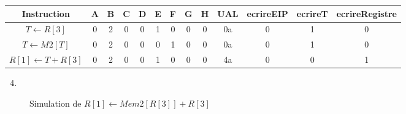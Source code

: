 \documentclass{article}
\begin{document}
\begin{minipage}[h]{\linewidth}
	\centering
	\begin{tabular}{*{13}{|c} |}
		\hline
		Instruction                & A & B & C & D & E & F & G & H & UAL & ecrireEIP & ecrireT & ecrireRegistre \\ \hline
		$T \leftarrow R[3]$        & 0 & 2 & 0 & 0 & 1 & 0 & 0 & 0 & 0a  & 0         & 1       & 0              \\ \hline
		$T \leftarrow M2[T]$       & 0 & 2 & 0 & 0 & 0 & 1 & 0 & 0 & 0a  & 0         & 1       & 0              \\ \hline
		$R[1] \leftarrow T + R[3]$ & 0 & 2 & 0 & 0 & 1 & 0 & 0 & 0 & 4a  & 0         & 0       & 1              \\ \hline
	\end{tabular}
\end{minipage}
\newpage
\begin{enumerate}
	\begin{enumerate}[label=\alph*)]
		\setcounter{enumii}{3}
		\item
	\end{enumerate}
\end{enumerate}
\begin{figure}[h]
	\caption{Simulation de $R[1] \leftarrow Mem2[R[3]] + R[3]$}
	\label{}
\end{figure}
\end{document}
